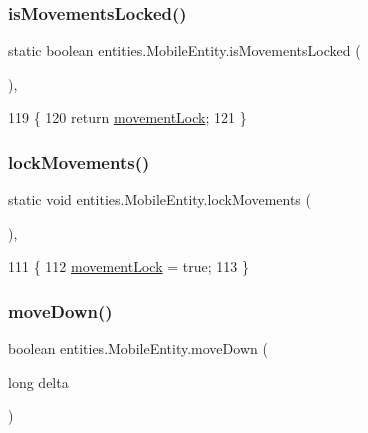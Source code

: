 \subsubsection{\texorpdfstring{is\+Movements\+Locked()}{isMovementsLocked()}}
{\footnotesize\ttfamily static boolean entities.\+Mobile\+Entity.\+is\+Movements\+Locked (\begin{DoxyParamCaption}{ }\end{DoxyParamCaption})\hspace{0.3cm}{\ttfamily [inline]}, {\ttfamily [static]}}


\begin{DoxyCode}
119                                               \{
120         \textcolor{keywordflow}{return} \mbox{\hyperlink{classentities_1_1_mobile_entity_a11e74ffe949d0d32ab26bcf36fa2bb1d}{movementLock}};
121     \}
\end{DoxyCode}
\mbox{\label{classentities_1_1_mobile_entity_a3284200b03980579fdae3aafd10c062b}} 
\subsubsection{\texorpdfstring{lock\+Movements()}{lockMovements()}}
{\footnotesize\ttfamily static void entities.\+Mobile\+Entity.\+lock\+Movements (\begin{DoxyParamCaption}{ }\end{DoxyParamCaption})\hspace{0.3cm}{\ttfamily [inline]}, {\ttfamily [static]}}


\begin{DoxyCode}
111                                        \{
112         \mbox{\hyperlink{classentities_1_1_mobile_entity_a11e74ffe949d0d32ab26bcf36fa2bb1d}{movementLock}} = \textcolor{keyword}{true};
113     \}
\end{DoxyCode}
\mbox{\label{classentities_1_1_mobile_entity_a0017810fbe9ef38039f90044cdecb2e6}} 
\subsubsection{\texorpdfstring{move\+Down()}{moveDown()}}
{\footnotesize\ttfamily boolean entities.\+Mobile\+Entity.\+move\+Down (\begin{DoxyParamCaption}\item[{long}]{delta }\end{DoxyParamCaption})\hspace{0.3cm}{\ttfamily [inline]}}


